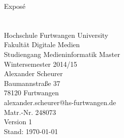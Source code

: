 \begin{center}

\Huge
Expos\'{e}\\[24pt]

\huge
{}\\[24pt]

\LARGE
{}\\[24pt]

\large
Hochschule Furtwangen University\\
Fakultät Digitale Medien\\
Studiengang Medieninformatik Master\\
Wintersemester 2014/15\\[24pt]

\normalsize
Alexander Scheurer\\
Baumannstraße 37\\
78120 Furtwangen\\[12pt]
alexander.scheurer@hs-furtwangen.de\\
Matr.-Nr. 248073\\[24pt]

Version 1\\
Stand: \today

\end{center}
\clearpage